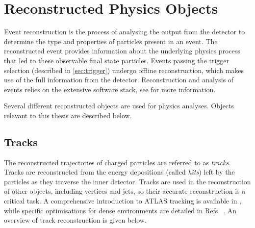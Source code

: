 









\section{Reconstructed Physics Objects}\label{sec:physics-objects}

Event reconstruction is the process of analysing the output from the detector to determine the type and properties of particles present in an event. 
The reconstructed event provides information about the underlying physics process that led to these observable final state particles.
Events passing the trigger selection (described in \cref{sec:trigger}) undergo offline reconstruction, which makes use of the full information from the detector.
Reconstruction and analysis of events relies on the extensive \ATLAS software stack, see  for more information.

Several different reconstructed objects are used for physics analyses.
Objects relevant to this thesis are described below.



\subsection{Tracks}\label{sec:track_reco}
The reconstructed trajectories of charged particles are referred to as \textit{tracks}.
Tracks are reconstructed from the energy depositions (called \textit{hits}) left by the particles as they traverse the inner detector.
Tracks are used in the reconstruction of other objects, including vertices and jets, so their accurate reconstruction is a critical task.
A comprehensive introduction to ATLAS tracking is available in , while specific optimisations for dense environments are detailed in Refs.~\cite{ATL-PHYS-PUB-2015-006, PERF-2015-08}.
An overview of track reconstruction is given below.

